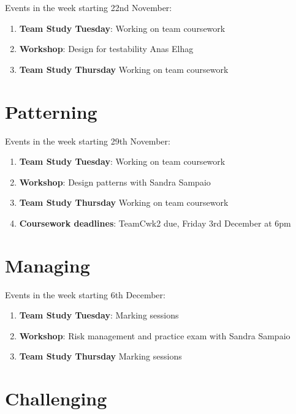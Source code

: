 \documentclass[
]{book}
\providecommand{\tightlist}{%
  \setlength{\itemsep}{0pt}\setlength{\parskip}{0pt}}
\begin{document}
Events in the week starting 22nd November:

\begin{enumerate}
\def\labelenumi{\arabic{enumi}.}
\tightlist
\item
  \textbf{Team Study Tuesday}: Working on team coursework
\item
  \textbf{Workshop}: Design for testability Anas Elhag
\item
  \textbf{Team Study Thursday} Working on team coursework
\end{enumerate}

\hypertarget{week10}{%
\section{Patterning}\label{week10}}

Events in the week starting 29th November:

\begin{enumerate}
\def\labelenumi{\arabic{enumi}.}
\tightlist
\item
  \textbf{Team Study Tuesday}: Working on team coursework
\item
  \textbf{Workshop}: Design patterns with Sandra Sampaio
\item
  \textbf{Team Study Thursday} Working on team coursework
\item
  \textbf{Coursework deadlines}: TeamCwk2 due, Friday 3rd December at 6pm
\end{enumerate}

\hypertarget{week11}{%
\section{Managing}\label{week11}}

Events in the week starting 6th December:

\begin{enumerate}
\def\labelenumi{\arabic{enumi}.}
\tightlist
\item
  \textbf{Team Study Tuesday}: Marking sessions
\item
  \textbf{Workshop}: Risk management and practice exam with Sandra Sampaio
\item
  \textbf{Team Study Thursday} Marking sessions
\end{enumerate}

\hypertarget{week12}{%
\section{Challenging}\label{week12}}
\end{document}
